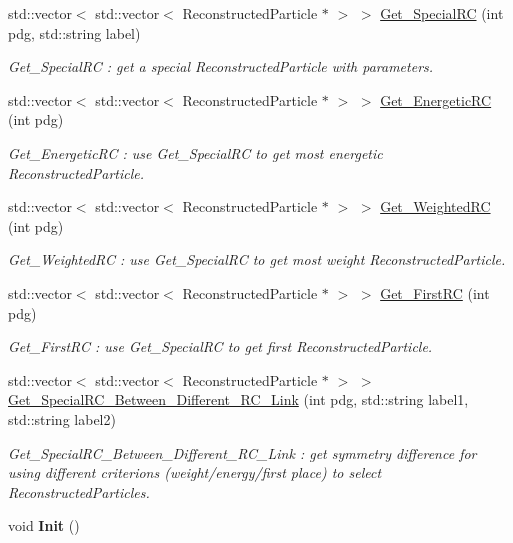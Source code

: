 \begin{DoxyCompactItemize}
std::vector$<$ std::vector$<$ ReconstructedParticle $\ast$ $>$ $>$ \hyperlink{classToolSet_1_1CChain__Vec_a3cc0cdb7a3ed1b11da160fb5f709694f}{Get\_\-SpecialRC} (int pdg, std::string label)
\begin{DoxyCompactList}\small\item\em Get\_\-SpecialRC : get a special ReconstructedParticle with parameters. \item\end{DoxyCompactList}\item 
std::vector$<$ std::vector$<$ ReconstructedParticle $\ast$ $>$ $>$ \hyperlink{classToolSet_1_1CChain__Vec_a820a5e8d1bde159334145996758d085e}{Get\_\-EnergeticRC} (int pdg)
\begin{DoxyCompactList}\small\item\em Get\_\-EnergeticRC : use Get\_\-SpecialRC to get most energetic ReconstructedParticle. \item\end{DoxyCompactList}\item 
std::vector$<$ std::vector$<$ ReconstructedParticle $\ast$ $>$ $>$ \hyperlink{classToolSet_1_1CChain__Vec_a603890a7bfff43b56cb6eba14e81fee2}{Get\_\-WeightedRC} (int pdg)
\begin{DoxyCompactList}\small\item\em Get\_\-WeightedRC : use Get\_\-SpecialRC to get most weight ReconstructedParticle. \item\end{DoxyCompactList}\item 
std::vector$<$ std::vector$<$ ReconstructedParticle $\ast$ $>$ $>$ \hyperlink{classToolSet_1_1CChain__Vec_a905c1fd107c1b322d6ef151f663e572b}{Get\_\-FirstRC} (int pdg)
\begin{DoxyCompactList}\small\item\em Get\_\-FirstRC : use Get\_\-SpecialRC to get first ReconstructedParticle. \item\end{DoxyCompactList}\item 
std::vector$<$ std::vector$<$ ReconstructedParticle $\ast$ $>$ $>$ \hyperlink{classToolSet_1_1CChain__Vec_abf7fb35af91c6059d381d5a278a96574}{Get\_\-SpecialRC\_\-Between\_\-Different\_\-RC\_\-Link} (int pdg, std::string label1, std::string label2)
\begin{DoxyCompactList}\small\item\em Get\_\-SpecialRC\_\-Between\_\-Different\_\-RC\_\-Link : get symmetry difference for using different criterions (weight/energy/first place) to select ReconstructedParticles. \item\end{DoxyCompactList}\item 
\hypertarget{classToolSet_1_1CChain__Vec_a814d3a551ec3986ba85ba598a38ced91}{
void {\bfseries Init} ()}
\label{classToolSet_1_1CChain__Vec_a814d3a551ec3986ba85ba598a38ced91}


\end{DoxyCompactItemize}

